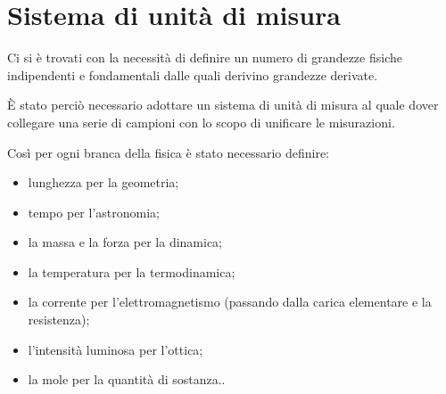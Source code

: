 \documentclass[a4paper, 15pt]{article}
\begin{document}
\section{Sistema di unità di misura}
\begin{adjustwidth}{2in}{}
	Ci si è trovati con la necessità di definire un numero di grandezze fisiche indipendenti e fondamentali dalle quali derivino grandezze derivate. 
	
	È stato perciò necessario adottare un sistema di unità di misura al quale dover collegare una serie di campioni con lo scopo di unificare le misurazioni. 
	
	Così per ogni branca della fisica è stato necessario definire:
	\begin{itemize}
		\item lunghezza per la geometria;
		\item tempo per l'astronomia;
		\item la massa e la forza  per la dinamica;
		\item la temperatura per la termodinamica;
		\item la corrente per l'elettromagnetismo (passando dalla carica elementare e la resistenza);
		\item l'intensità luminosa per l'ottica;
		\item la mole per la quantità di sostanza..
	\end{itemize}


\end{adjustwidth}
\end{document}
